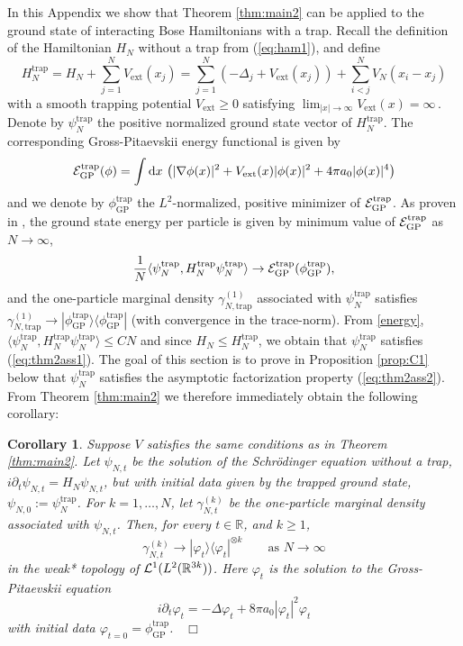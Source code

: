 \documentclass[11pt]{article}
\newtheorem{corollary}[theorem]{Corollary}
\newcommand{\rd}{{\rm d}}
\newcommand{\be}{\begin{equation}}
\newcommand{\ee}{\end{equation}}
\newcommand{\Htrap}{H_N^{\text{trap}}}
\newcommand{\Vtrap}{V_{\text{ext}}}
\newcommand{\psitrap}{\psi_N^{\text{trap}}}
\newcommand{\phitrap}{\phi_{\text{GP}}^{\text{trap}}}
\newcommand{\ph}{\varphi}
\newcommand{\bR}{{\mathbb R}}
\newcommand{\cE}{{\cal E}}
\newcommand{\cL}{{\cal L}}
\begin{document}
In this Appendix we show that Theorem \ref{thm:main2}
can be applied to the ground state of interacting Bose Hamiltonians
with a trap.
Recall the definition of the
Hamiltonian $H_N$ without a trap from (\ref{eq:ham1}),
and define
\[ \Htrap = H_N + \sum_{j=1}^N \Vtrap (x_j) = \sum_{j=1}^N \left(-\Delta_j +
\Vtrap (x_j) \right) + \sum_{i<j}^N V_N (x_i -x_j) \] with a smooth
trapping potential $\Vtrap \geq 0$ satisfying \( \lim_{|x| \to
\infty} \Vtrap (x) = \infty \,. \) Denote by $\psitrap$ the positive
normalized ground state vector of $\Htrap$. The corresponding
Gross-Pitaevskii energy functional is given by
\[ \cE_{\text{GP}}^{\text{trap}} (\phi) = \int \rd x \,
\left( |\nabla \phi (x)|^2
+ \Vtrap (x) |\phi (x)|^2 + 4\pi a_0 |\phi (x)|^4 \right) \] and we
denote by $\phitrap$ the $L^2$-normalized, positive minimizer of
$\cE_{\text{GP}}^{\text{trap}}$. As proven in \cite{LS}, the
ground state energy per particle is given by minimum value of
$ \cE_{\text{GP}}^{\text{trap}} $ as $N\to\infty$,
\be
     \frac{1}{N} \langle \psitrap, \Htrap\psitrap\rangle
\to \cE_{\text{GP}}^{\text{trap}} (\phitrap),
\label{energy}
\ee
and the one-particle marginal density $\gamma^{(1)}_{N, \text{trap}}$
associated with $\psitrap$ satisfies $\gamma^{(1)}_{N, \text{trap}}
\to |\phitrap \rangle \langle \phitrap|$ (with
convergence in the trace-norm).
{F}rom \eqref{energy}, $\langle
\psitrap, \Htrap \psitrap \rangle \leq C N$ and
since $H_N \leq \Htrap$, we  obtain that
$\psitrap$ satisfies (\ref{eq:thm2ass1}).
The goal of this section is to prove in Proposition
\ref{prop:C1} below
that $\psitrap$  satisfies the asymptotic factorization
property (\ref{eq:thm2ass2}). From Theorem \ref{thm:main2}
we therefore immediately  obtain  the
following corollary:

\begin{corollary}\label{cor:main3}
Suppose $V$ satisfies the same conditions as in Theorem
\ref{thm:main2}. Let $\psi_{N,t}$ be the solution of the
Schr\"odinger equation without a trap, $i\partial_t \psi_{N,t} =
H_N\psi_{N,t}$, but with initial data given by the trapped ground
state, $ \psi_{N,0}:= \psitrap$. For $k =1, \dots, N$, let
$\gamma_{N,t}^{(k)}$ be the one-particle marginal density associated
with $\psi_{N,t}$. Then, for every $t \in \bR$, and $k \geq 1$,
\begin{equation}\label{eq:restrap}
\gamma^{(k)}_{N,t} \to |\ph_t \rangle \langle \ph_t|^{\otimes k}
\qquad \text{as } N\to\infty
\end{equation}
in the weak* topology of $\cL^1 (L^2 (\bR^{3k}))$. Here $\ph_t$ is
the solution to the Gross-Pitaevskii equation
\[ i\partial_t \ph_t = -\Delta \ph_t + 8 \pi a_0 |\ph_t|^2 \ph_t \]
with initial data $\ph_{t=0} = \phitrap$. $\;\;\Box$
\end{corollary}
\end{document}
